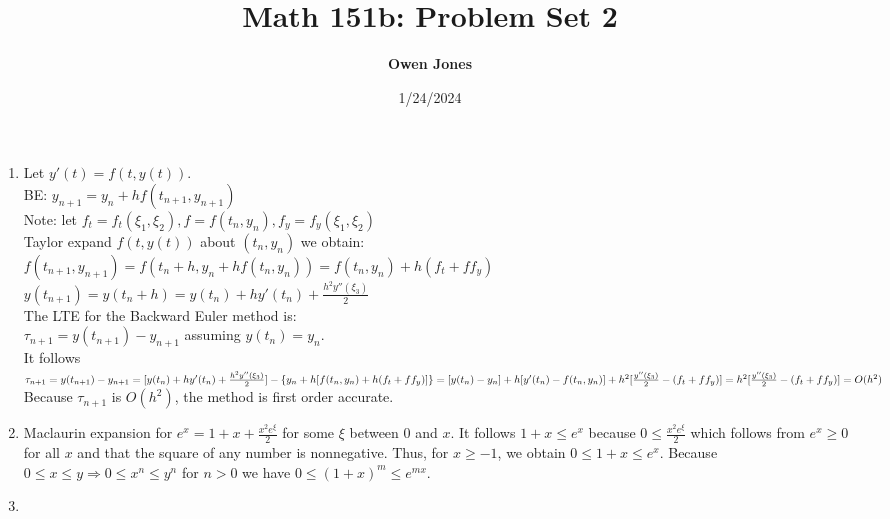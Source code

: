 \documentclass[10pt]{article}
\title{\bf Math 151b: Problem Set 2}
\date{1/24/2024}
\author{\bf Owen Jones}
\begin{document}
\maketitle
\begin{enumerate}[label=\bf{Problem \arabic*}]
    \item Let $y'(t)=f(t,y(t))$.\\
    BE\@: $y_{n+1}=y_n+hf(t_{n+1},y_{n+1})$\\
    Note: let $f_t=f_t(\xi_1,\xi_2),f=f(t_n,y_n),f_y=f_y(\xi_1,\xi_2)$\\
    Taylor expand $f(t,y(t))$ about $(t_n,y_n)$ we obtain:\\
    $f(t_{n+1},y_{n+1})=f(t_n+h,y_n+hf(t_n,y_n))=f(t_n,y_n)+h(f_t+ff_y)$\\
    $y(t_{n+1})=y(t_n+h)=y(t_n)+hy'(t_n)+\frac{h^2y''(\xi_3)}{2}$\\
    The LTE for the Backward Euler method is:\\
    $\tau_{n+1}=y(t_{n+1})-y_{n+1}$ assuming $y(t_n)=y_n$.\\
    It follows $\tau_{n+1}=y(t_{n+1})-y_{n+1}\\
    =[y(t_n)+hy'(t_n)+\frac{h^2y''(\xi_3)}{2}]-\{y_n+h[f(t_n,y_n)+h(f_t+ff_y)]\}\\
    =[y(t_n)-y_n]+h[y'(t_n)-f(t_n,y_n)]+h^2[\frac{y''(\xi_3)}{2}-(f_t+ff_y)]\\
    =h^2[\frac{y''(\xi_3)}{2}-(f_t+ff_y)]=O(h^2)$\\
    Because $\tau_{n+1}$ is $O(h^2)$, the method is first order accurate.
    \item Maclaurin expansion for $e^x=1+x+\frac{x^2e^\xi}{2}$ for some $\xi$ between $0$ and $x$. 
    It follows $1+x\le e^x$ because $0\le \frac{x^2e^\xi}{2}$ which follows from $e^x\ge0$ for all $x$ and that the square of any number is nonnegative.
    Thus, for $x\ge-1$, we obtain $0\le 1+x\le e^x$.
    Because $0\le x\le y\Rightarrow 0\le x^n\le y^n$ for $n>0$ we have $0\le {(1+x)}^m\le e^{mx}$.
    \item {}
\end{enumerate}
\end{document}
